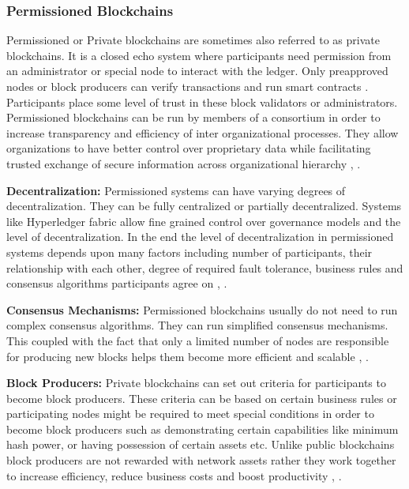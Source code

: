 \subsubsection{Permissioned Blockchains}
Permissioned or Private blockchains are sometimes also referred to as private blockchains. It is a closed echo system where participants need permission from an administrator or special node to interact with the ledger. Only preapproved nodes or block producers can verify transactions and run smart contracts \cite{misc:018}. Participants place some level of trust in these block validators or administrators. Permissioned blockchains can be run by members of a consortium in order to increase transparency and efficiency of inter organizational processes. They allow organizations to have better control over proprietary data while facilitating trusted exchange of secure information across organizational hierarchy \cite{misc:018}, \cite{misc:017}.

\textbf{Decentralization:}
Permissioned systems can have varying degrees of decentralization. They can be fully centralized or partially decentralized. Systems like Hyperledger fabric allow fine grained control over governance models and the level of decentralization. In the end the level of decentralization in permissioned systems depends upon many factors including number of participants, their relationship with each other, degree of required fault tolerance, business rules and consensus algorithms participants agree on \cite{misc:018}, \cite{misc:017}.

\textbf{Consensus Mechanisms:}
Permissioned blockchains usually do not need to run complex consensus algorithms. They can run simplified consensus mechanisms. This coupled with the fact that only a limited number of nodes are responsible for producing new blocks helps them become more efficient and scalable \cite{misc:018}, \cite{misc:017}.

\textbf{Block Producers:}
Private blockchains can set out criteria for participants to become block producers. These criteria can be based on certain business rules or participating nodes might be required to meet special conditions in order to become block producers such as demonstrating certain capabilities like minimum hash power, or having possession of certain assets etc. Unlike public blockchains block producers are not rewarded with network assets rather they work together to increase efficiency, reduce business costs and boost productivity \cite{misc:018}, \cite{misc:017}.
   
